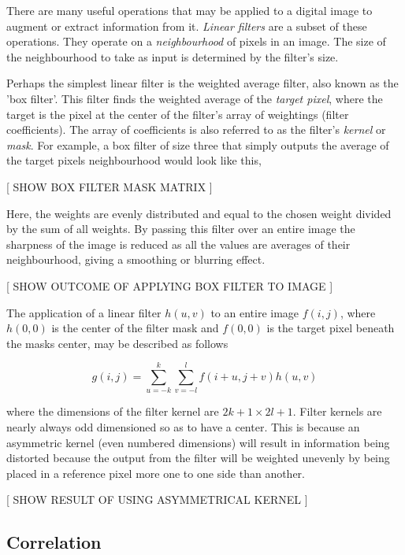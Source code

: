 There are many useful operations that may be applied to a digital image to augment or extract information from it. \emph{Linear filters} are a subset of these operations. They operate on a \emph{neighbourhood} of pixels in an image. The size of the neighbourhood to take as input is determined by the filter's size. 

Perhaps the simplest linear filter is the weighted average filter, also known as the 'box filter'. This filter finds the weighted average of the \emph{target pixel}, where the target is the pixel at the center of the filter's array of weightings (filter coefficients). The array of coefficients is also referred to as the filter's \emph{kernel} or \emph{mask}. For example, a box filter of size three that simply outputs the average of the target pixels neighbourhood would look like this,

[ SHOW BOX FILTER MASK MATRIX ]

Here, the weights are evenly distributed and equal to the chosen weight divided by the sum of all weights. By passing this filter over an entire image the sharpness of the image is reduced as all the values are averages of their neighbourhood, giving a smoothing or blurring effect.

[ SHOW OUTCOME OF APPLYING BOX FILTER TO IMAGE ]


The application of a linear filter $h(u,v)$ to an entire image $f(i,j)$, where $h(0,0)$ is the center of the filter mask and $f(0,0)$ is the target pixel beneath the masks center, may be described as follows

\begin{equation} \label{eq:1}
g(i,j) = \sum_{u=-k}^{k}\sum_{v = -l}^{l}f(i+u,j+v)h(u,v)
\end{equation}


where the dimensions of the filter kernel are $2k+1 \times 2l+1$. Filter kernels are nearly always odd dimensioned so as to have a center. This is because an asymmetric kernel (even numbered dimensions) will result in information being distorted because the output from the filter will be weighted unevenly by being placed in a reference pixel more one to one side than another.

[ SHOW RESULT OF USING ASYMMETRICAL KERNEL ] 



\subsection{Correlation}

